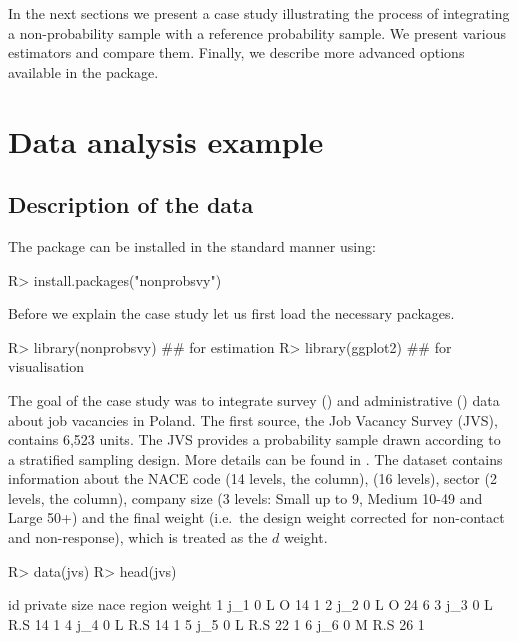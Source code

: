 \documentclass[
]{jss}
\begin{document}
In the next sections we present a case study illustrating the process of
integrating a non-probability sample with a reference probability
sample. We present various estimators and compare them. Finally, we
describe more advanced options available in the package.

\section{Data analysis example}\label{sec-data-analysis}

\subsection{Description of the data}\label{description-of-the-data}

The package can be installed in the standard manner using:

\begin{CodeChunk}
\begin{CodeInput}
R> install.packages("nonprobsvy")
\end{CodeInput}
\end{CodeChunk}

Before we explain the case study let us first load the necessary
packages.

\begin{CodeChunk}
\begin{CodeInput}
R> library(nonprobsvy) ## for estimation
R> library(ggplot2) ## for visualisation
\end{CodeInput}
\end{CodeChunk}

The goal of the case study was to integrate survey () and
administrative () data about job vacancies in Poland. The
first source, the Job Vacancy Survey (JVS), contains 6,523 units. The
JVS provides a probability sample drawn according to a stratified
sampling design. More details can be found in \cite{jvs2022}. The
dataset contains information about the NACE code (14 levels, the
 column),  (16 levels), sector (2 levels, the
 column), company size (3 levels: Small up to 9, Medium
10-49 and Large 50+) and the final weight (i.e.~the design weight
corrected for non-contact and non-response), which is treated as the
\(d\) weight.

\begin{CodeChunk}
\begin{CodeInput}
R> data(jvs)
R> head(jvs)
\end{CodeInput}
\begin{CodeOutput}
   id private size nace region weight
1 j_1       0    L    O     14      1
2 j_2       0    L    O     24      6
3 j_3       0    L  R.S     14      1
4 j_4       0    L  R.S     14      1
5 j_5       0    L  R.S     22      1
6 j_6       0    M  R.S     26      1
\end{CodeOutput}
\end{CodeChunk}
\end{document}
